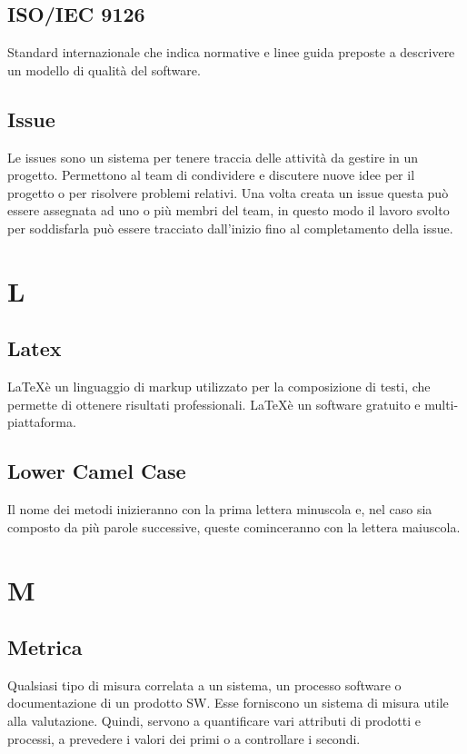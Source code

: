 {	\subsection{ISO/IEC 9126}
	Standard internazionale che indica normative e linee guida preposte a descrivere un modello di qualità del software.
	
	\subsection{Issue}
	Le issues sono un sistema per tenere traccia delle attività da gestire in un progetto. Permettono al team di condividere e discutere nuove idee per il progetto o per risolvere problemi relativi. Una volta creata un issue questa può essere assegnata ad uno o più membri del team, in questo modo il lavoro svolto per soddisfarla può essere tracciato dall'inizio fino al completamento della issue.
	
	\section{L}
	\subsection{Latex} 
	\LaTeX è un linguaggio di markup utilizzato per la composizione di testi, che permette di ottenere risultati professionali. \LaTeX è un software gratuito e multi-piattaforma.
	
	\subsection{Lower Camel Case} 
	Il nome dei metodi inizieranno con la prima lettera minuscola e, nel caso sia composto da più parole successive, queste cominceranno con la lettera maiuscola.
	
	\section{M}
	\subsection{Metrica} 
	Qualsiasi tipo di misura correlata a un sistema, un processo software o documentazione di un prodotto SW. Esse forniscono un sistema di misura utile alla valutazione. Quindi, servono a quantificare vari attributi di prodotti e processi, a prevedere i valori dei primi o a controllare i secondi.
	
}

